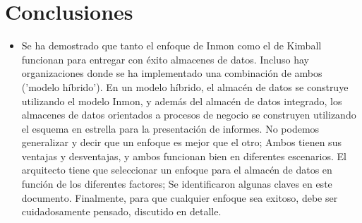 \documentclass[twoside,twocolumn]{article}
\begin{document}








\section{Conclusiones}
\begin{itemize}	
\item
Se ha demostrado que tanto el enfoque de Inmon como el de Kimball funcionan para entregar con éxito almacenes de datos. Incluso hay organizaciones donde se ha implementado una combinación de ambos ('modelo híbrido'). En un modelo híbrido, el almacén de datos se construye utilizando el modelo Inmon, y además del almacén de datos integrado, los almacenes de datos orientados a procesos de negocio se construyen utilizando el esquema en estrella para la presentación de informes. No podemos generalizar y decir que un enfoque es mejor que el otro; Ambos tienen sus ventajas y desventajas, y ambos funcionan bien en diferentes escenarios. El arquitecto tiene que seleccionar un enfoque para el almacén de datos en función de los diferentes factores; Se identificaron algunas claves en este documento. Finalmente, para que cualquier enfoque sea exitoso, debe ser cuidadosamente pensado, discutido en detalle.
\end{itemize} 



\end{document}
